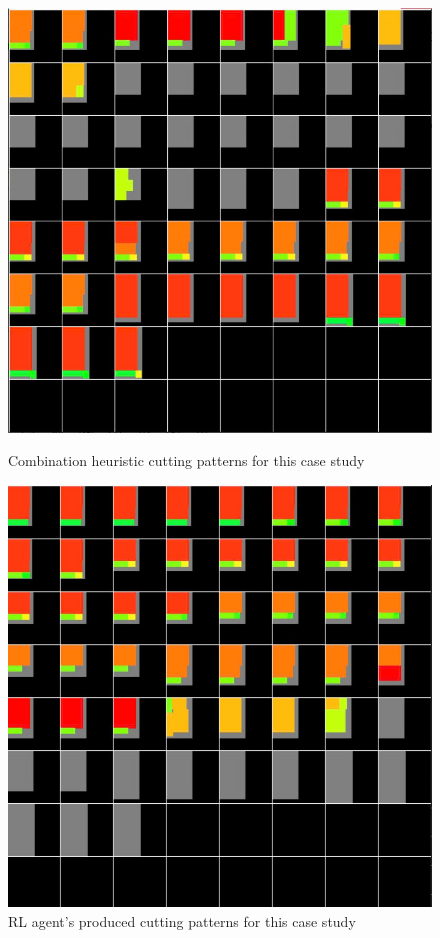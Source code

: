 \documentclass[a4paper]{article}
\begin{document}
    \begin{figure}[htbp]
        \centering
        \begin{minipage}{0.45\textwidth}
            \centering
            \includegraphics[width=\textwidth]{Image/case_study_heuristic.jpg}
            \caption{Combination heuristic cutting patterns for this case study}
        \end{minipage}
        \hfill
        \begin{minipage}{0.45\textwidth}
            \centering
            \includegraphics[width=\textwidth]{Image/case_study_RL.jpg}
            \caption{RL agent's produced cutting patterns for this case study}
        \end{minipage}
    \end{figure}
\end{document}
